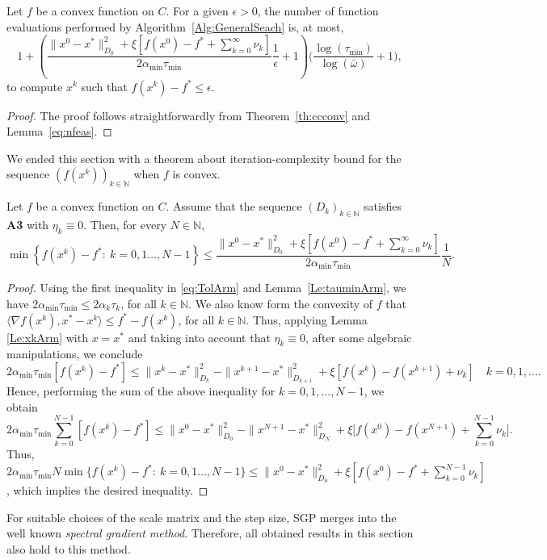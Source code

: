 \begin{theorem}
	Let $f$ be a convex function on $C$. For a given $\epsilon>0$, the number  of  function evaluations performed by  Algorithm~\textup{\ref{Alg:GeneralSeach}} is,  at most,
	$$1+\left(\frac{\|x^0 - x^*\|^2_{D_0} + \xi\left[f(x^0)-f^*+ \sum_{k=0}^{\infty} \nu_k\right]}{2 \alpha_{\min} \tau_{\min}}\frac{1}{\epsilon} + 1 \right)\Big(\frac{\log (\tau_{\min})}{\log (\bar\omega)}+1\Big),$$
	to compute $x^k$ such that $f(x^k) - f^*\leq \epsilon$.
\end{theorem}
\begin{proof}
	The proof follows straightforwardly from Theorem~\ref{th:ccconv} and  Lemma~\ref{eq:nfeas}.
\end{proof}
We ended this section with a  theorem about  iteration-complexity bound for the sequence $\left(f(x^k)\right)_{k\in\mathbb{N}}$ when $f$ is convex.
\begin{theorem} \label{th:ccconv}
	Let $f$ be a convex function on $C$. {Assume  that    the sequence $(D_k)_{k\in {\mathbb N}}$ satisfies {\bf A3} with $\eta_k\equiv 0$}. Then, for every $N \in \mathbb{N}$,
	$$
		\min \left\{f(x^k) - f^* :~k = 0, 1 \ldots, N-1\right\} \leq \frac{\|x^0 - x^*\|^2_{D_0} + \xi\left[f(x^0)-f^*+ \sum_{k=0}^{\infty} \nu_k\right]}{2 \alpha_{\min} \tau_{\min}}\frac{1}{N}.
	$$
\end{theorem}

\begin{proof}
	Using the first inequality in \eqref{eq:TolArm} and Lemma~\ref{Le:tauminArm}, we have $2 \alpha_{\min} \tau_{\min} \leq 2 \alpha_k \tau_k$, for all $k\in {\mathbb N}$. We also know form the convexity of $f$ that $\langle \nabla f(x^k), x^*-x^k \rangle \leq f^* - f(x^k)$, for all $k\in {\mathbb N}$. Thus, applying Lemma \ref{Le:xkArm} with $x=x^*$ {and taking into account that $\eta_k\equiv 0$},  after some algebraic manipulations, we conclude
	$$
		2 \alpha_{\min} \tau_{\min} \left[f(x^k)-f^*\right] \leq \|x^k-x^*\|_{D_k}^2-\|x^{k+1}-x^*\|_{D_{k+1}}^2 + \xi \left[f(x^k) - f(x^{k+1})+\nu_k \right] \quad k = 0, 1, \ldots.
	$$
	Hence, performing the sum of the above inequality for $k = 0,1,\ldots, N-1$, we obtain
	$$
		2 \alpha_{\min} \tau_{\min}\sum_{k=0}^{N-1} \left[f(x^k)-f^*\right] \leq \|x^0-x^*\|_{D_0}^2-\|x^{N+1}-x^*\|_{D_{N}}^2 + \xi\Big[f(x^0)-f(x^{N+1})+ \sum_{k=0}^{N-1} \nu_k\Big].
	$$
	Thus, $2\alpha_{\min} \tau_{\min} N \min\{f(x^k) - f^*:~ k = 0, 1 \ldots, N-1\} \leq \|x^0 - x^*\|^2_{D_0}+ \xi[f(x^0)-f^*+ \sum_{k=0}^{N-1} \nu_k]$, which implies the desired inequality.
\end{proof}
\begin{remark}\normalfont
	For suitable choices  of the scale matrix  and the step size,  SGP merges into the well known {\it spectral gradient method}. Therefore, all obtained results in this section  also hold to this method.
\end{remark}\normalfont